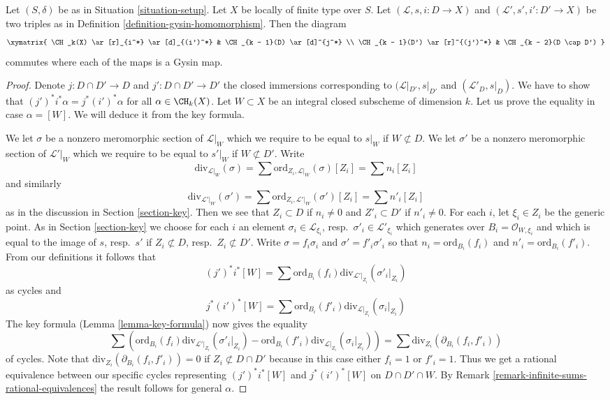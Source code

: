 \begin{lemma}
\label{lemma-gysin-commutes-gysin}
Let $(S, \delta)$ be as in Situation \ref{situation-setup}. Let $X$ be locally
of finite type over $S$. Let $(\mathcal{L}, s, i : D \to X)$ and
$(\mathcal{L}', s', i' : D' \to X)$ be two triples as in
Definition \ref{definition-gysin-homomorphism}. Then the diagram
$$
\xymatrix{
\CH_k(X) \ar[r]_{i^*} \ar[d]_{(i')^*} & \CH_{k - 1}(D) \ar[d]^{j^*} \\
\CH_{k - 1}(D') \ar[r]^{(j')^*} & \CH_{k - 2}(D \cap D')
}
$$
commutes where each of the maps is a Gysin map.
\end{lemma}

\begin{proof}
Denote $j : D \cap D' \to D$ and $j' : D \cap D' \to D'$ the closed
immersions corresponding to $(\mathcal{L}|_{D'}, s|_{D'}$ and
$(\mathcal{L}'_D, s|_D)$. We have to show that
$(j')^*i^*\alpha = j^* (i')^*\alpha$ for all $\alpha \in \CH_k(X)$.
Let $W \subset X$ be an integral closed subscheme of dimension $k$.
Let us prove the equality in case $\alpha = [W]$. We will deduce
it from the key formula.

\medskip\noindent
We let $\sigma$ be a nonzero meromorphic section of $\mathcal{L}|_W$
which we require to be equal to $s|_W$ if $W \not \subset D$.
We let $\sigma'$ be a nonzero meromorphic section of $\mathcal{L}'|_W$
which we require to be equal to $s'|_W$ if $W \not \subset D'$.
Write
$$
\text{div}_{\mathcal{L}|_W}(\sigma) =
\sum \text{ord}_{Z_i, \mathcal{L}|_W}(\sigma)[Z_i] = \sum n_i[Z_i]
$$
and similarly
$$
\text{div}_{\mathcal{L}'|_W}(\sigma') =
\sum \text{ord}_{Z_i, \mathcal{L}'|_W}(\sigma')[Z_i] = \sum n'_i[Z_i]
$$
as in the discussion in Section \ref{section-key}.
Then we see that $Z_i \subset D$ if $n_i \not = 0$ and
$Z'_i \subset D'$ if $n'_i \not = 0$. For each $i$, let $\xi_i \in Z_i$
be the generic point. As in Section \ref{section-key} we choose
for each $i$ an element
$\sigma_i \in \mathcal{L}_{\xi_i}$, resp.\ $\sigma'_i \in \mathcal{L}'_{\xi_i}$
which generates over $B_i = \mathcal{O}_{W, \xi_i}$
and which is equal to the image of
$s$, resp.\ $s'$ if $Z_i \not \subset D$, resp.\ $Z_i \not \subset D'$.
Write $\sigma = f_i \sigma_i$ and $\sigma' = f'_i\sigma'_i$ so that
$n_i = \text{ord}_{B_i}(f_i)$ and
$n'_i = \text{ord}_{B_i}(f'_i)$.
From our definitions it follows that
$$
(j')^*i^*[W] =
\sum \text{ord}_{B_i}(f_i) \text{div}_{\mathcal{L}'|_{Z_i}}(\sigma'_i|_{Z_i})
$$
as cycles and
$$
j^*(i')^*[W] =
\sum \text{ord}_{B_i}(f'_i) \text{div}_{\mathcal{L}|_{Z_i}}(\sigma_i|_{Z_i})
$$
The key formula (Lemma \ref{lemma-key-formula}) now gives the equality
$$
\sum \left(
\text{ord}_{B_i}(f_i) \text{div}_{\mathcal{L}'|_{Z_i}}(\sigma'_i|_{Z_i}) -
\text{ord}_{B_i}(f'_i) \text{div}_{\mathcal{L}|_{Z_i}}(\sigma_i|_{Z_i})
\right) =
\sum \text{div}_{Z_i}(\partial_{B_i}(f_i, f'_i))
$$
of cycles. Note that $\text{div}_{Z_i}(\partial_{B_i}(f_i, f'_i)) = 0$ if
$Z_i \not \subset D \cap D'$ because in this case either $f_i = 1$
or $f'_i = 1$. Thus we get a rational equivalence between our specific
cycles representing $(j')^*i^*[W]$ and $j^*(i')^*[W]$ on $D \cap D' \cap W$.
By Remark \ref{remark-infinite-sums-rational-equivalences}
the result follows for general $\alpha$.
\end{proof}